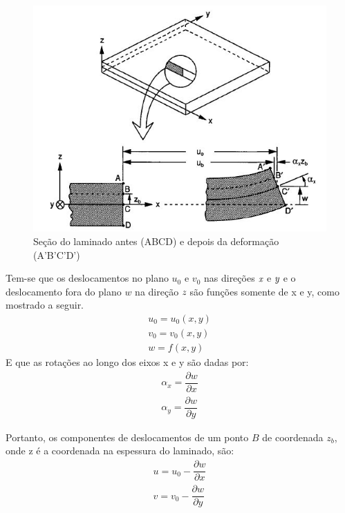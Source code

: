 \begin{figure}[h]
	\caption{\label{fig_laminatedeformation}Seção do laminado antes (ABCD) e depois da deformação (A'B'C'D')}
  \centering
  \includegraphics[scale=1.0]{figura/LaminateDeformation}
\end{figure}

Tem-se que os deslocamentos no plano $u_0$ e $v_0$ nas direções $\emph x$ e $\emph y$ e o deslocamento fora do plano $w$ na direção $\emph z$ são funções somente de x e y, como mostrado a seguir.
\begin{equation} \label{displacements}
\begin{split}
u_{0}=u_{0}(x,y)\\
v_{0}=v_{0}(x,y)\\
w=f(x,y)
\end{split}
\end{equation}
E que as rotações ao longo dos eixos x e y são dadas por:
\begin{equation} \label{rotations}
\begin{split}
\alpha_{x}=\dfrac{\partial w} {\partial x}\\
\alpha_{y}=\dfrac{\partial w} {\partial y}
\end{split}
\end{equation}

Portanto, os componentes de deslocamentos de um ponto $B$ de coordenada $z_b$, onde z é a coordenada na espessura do laminado, são:
\begin{equation} \label{displacements_B}
\begin{split}
u=u_{0} - \dfrac{\partial w}{\partial x}\\
v=v_{0} - \dfrac{\partial w}{\partial y}
\end{split}
\end{equation}


